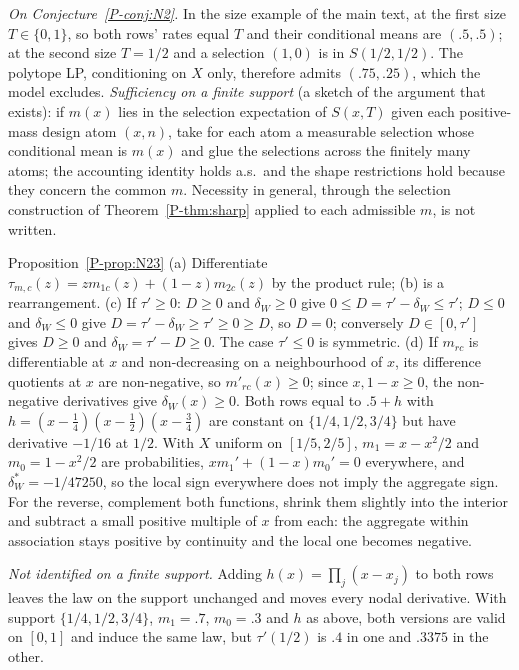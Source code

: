 \emph{On Conjecture~\ref{P-conj:N2}.} In the size example of the main text, at the
first size $T\in\{0,1\}$, so both rows' rates equal $T$ and their conditional means are
$(.5,.5)$; at the second size $T=1/2$ and a selection $(1,0)$ is in $S(1/2,1/2)$. The
polytope LP, conditioning on $X$ only, therefore admits $(.75,.25)$, which the model
excludes. \emph{Sufficiency on a finite support} (a sketch of the argument that exists):
if $m(x)$ lies in the selection expectation of $S(x,T)$ given each positive-mass design
atom $(x,n)$, take for each atom a measurable selection whose conditional mean is $m(x)$
and glue the selections across the finitely many atoms; the accounting identity holds
a.s.\ and the shape restrictions hold because they concern the common $m$. Necessity in
general, through the selection construction of Theorem~\ref{P-thm:sharp} applied to each
admissible $m$, is not written.

\begin{proofof}{Proposition~\ref{P-prop:N23}}
(a) Differentiate $\tau_{m,c}(z)=zm_{1c}(z)+(1-z)m_{2c}(z)$ by the product rule; (b) is
a rearrangement. (c) If $\tau'\ge0$: $D\ge0$ and $\delta_W\ge0$ give
$0\le D=\tau'-\delta_W\le\tau'$; $D\le0$ and $\delta_W\le0$ give
$D=\tau'-\delta_W\ge\tau'\ge0\ge D$, so $D=0$; conversely $D\in[0,\tau']$ gives $D\ge0$ and
$\delta_W=\tau'-D\ge0$. The case $\tau'\le0$ is symmetric. (d) If $m_{rc}$ is
differentiable at $x$ and non-decreasing on a neighbourhood of $x$, its difference
quotients at $x$ are non-negative, so $m'_{rc}(x)\ge0$; since $x,1-x\ge0$, the
non-negative derivatives give $\delta_W(x)\ge0$. Both rows equal to $.5+h$ with
$h=(x-\tfrac14)(x-\tfrac12)(x-\tfrac34)$ are constant on $\{1/4,1/2,3/4\}$ but have
derivative $-1/16$ at $1/2$. With $X$ uniform on $[1/5,2/5]$, $m_1=x-x^2/2$ and
$m_0=1-x^2/2$ are probabilities, $xm_1'+(1-x)m_0'=0$ everywhere, and
$\delta^*_W=-1/47250$, so the local sign everywhere does not imply the aggregate sign.
For the reverse, complement both functions, shrink them slightly into the interior and
subtract a small positive multiple of $x$ from each: the aggregate within association
stays positive by continuity and the local one becomes negative.

\emph{Not identified on a finite support.} Adding $h(x)=\prod_j(x-x_j)$ to both rows
leaves the law on the support unchanged and moves every nodal derivative. With support
$\{1/4,1/2,3/4\}$, $m_1=.7$, $m_0=.3$ and $h$ as above, both versions are valid on $[0,1]$
and induce the same law, but $\tau'(1/2)$ is $.4$ in one and $.3375$ in the other.
\end{proofof}

